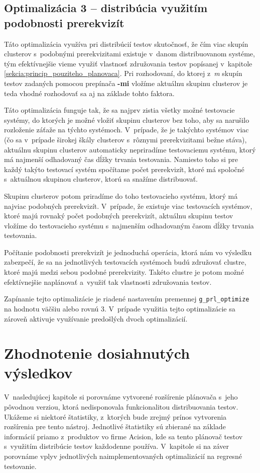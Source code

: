 \section{Optimalizácia 3 -- distribúcia využitím podobnosti prerekvizít}
\label{sekcia:optimalizacia3}
Táto optimalizácia využíva pri distribúcií testov skutočnosť, že čím viac
skupín clusterov s~podobnými prerekvizitami existuje v~danom 
distribuovanom systéme, tým efektívnejšie vieme využiť vlastnosť 
združovania testov popísanej v~kapitole 
\ref{sekcia:princip_pouziteho_planovaca}.
Pri rozhodovaní, do ktorej z~\textit{m} skupín testov zadaných pomocou 
prepínača \textbf{-mi} vložíme aktuálnu skupinu clusterov je teda vhodné 
rozhodovať sa aj na základe tohto faktora.

Táto optimalizácia funguje tak, že sa najprv zistia všetky možné 
testovacie systémy, do ktorých je možné vložiť skupinu clusterov bez toho, 
aby sa narušilo rozloženie záťaže na týchto systémoch. 
V~prípade, že je takýchto systémov viac (čo sa v~prípade širokej škály 
clusterov s~rôznymi prerekvizitami bežne stáva),
aktuálnu skupinu clusterov automaticky nepriradíme testovaciemu systému, 
ktorý má najmenší odhadovaný čas dĺžky trvania testovania. 
Namiesto toho si pre každý takýto testovací systém spočítame počet 
prerekvizít, ktoré má spoločné s~aktuálnou skupinou clusterov, ktorú 
sa snažíme distribuovať. 

Skupinu clusterov potom priradíme do toho testovacieho systému, ktorý 
má najviac podobných prerekvizít. V~prípade, že existuje viac 
testovacích systémov, ktoré majú rovnaký počet podobných prerekvizít, 
aktuálnu skupinu testov vložíme do testovacieho systému s~najmenším 
odhadovaným časom dĺžky trvania testovania.

Počítanie podobnosti prerekvizít je jednoduchá operácia, ktorá nám vo 
výsledku zabezpečí, že sa na jednotlivých testovacích systémoch budú 
združovať clustre, ktoré majú medzi sebou podobné prerekvizity. 
Takéto clustre je potom možné efektívnejšie naplánovať a~využiť tak 
vlastnosti združovania testov.

Zapínanie tejto optimalizácie je riadené nastavením premennej 
\texttt{g\_prl\_optimize} na hodnotu väčšiu alebo rovnú 3. 
V~prípade využitia tejto optimalizácie sa zároveň aktivuje využívanie 
predošlých dvoch optimalizácií.



%
%
\chapter{Zhodnotenie dosiahnutých výsledkov}
\label{kapitola:zhodnotenie_vysledkov}
V~nasledujúcej kapitole si porovnáme vytvorené rozšírenie plánovača s~jeho
pôvodnou verziou, ktorá nedisponovala funkcionalitou distribuovania testov.
Ukážeme si niektoré štatistiky, z~ktorých bude zrejmý prínos vytvorenia
rozšírenia pre tento nástroj. Jednotlivé štatistiky sú zbierané na základe
informácií priamo z~produktov vo firme Acision, kde sa tento plánovač testov
s~využitím distribúcie testov každodenne používa. V~kapitole si na záver 
porovnáme vplyv jednotlivých naimplementovaných optimalizácií na regresné
testovanie. 


